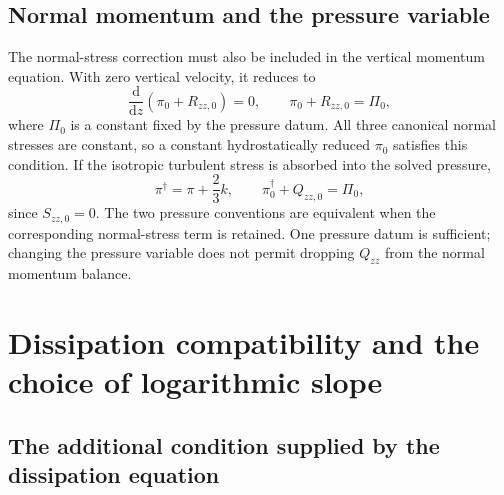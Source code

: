 \documentclass[11pt,a4paper]{article}
\numberwithin{equation}{section}
\newcommand{\dd}{\mathrm d}
\begin{document}
\subsection{Normal momentum and the pressure variable}
\label{out:pressure}

The normal-stress correction must also be included in the vertical
momentum equation. With zero vertical velocity, it reduces to
\begin{equation}
 \frac{\dd}{\dd z}(\pi_0+R_{zz,0})=0,
 \qquad
 \boxed{\pi_0+R_{zz,0}=\Pi_0,}
 \label{out:pressurebalance}
\end{equation}
where $\Pi_0$ is a constant fixed by the pressure datum. All three
canonical normal stresses are constant, so a constant hydrostatically
reduced $\pi_0$ satisfies this condition. If the isotropic turbulent
stress is absorbed into the solved pressure,
\begin{equation}
 \pi^\dagger=\pi+\frac23k,\qquad
 \boxed{\pi_0^\dagger+Q_{zz,0}=\Pi_0,}
 \label{out:modifiedpressure}
\end{equation}
since $S_{zz,0}=0$. The two pressure conventions are equivalent when
the corresponding normal-stress term is retained. One pressure datum
is sufficient; changing the pressure variable does not permit dropping
$Q_{zz}$ from the normal momentum balance.

\section{Dissipation compatibility and the choice of logarithmic slope}
\label{out:compatibility}

\subsection{The additional condition supplied by the dissipation equation}
\label{out:epscompat}
\end{document}
